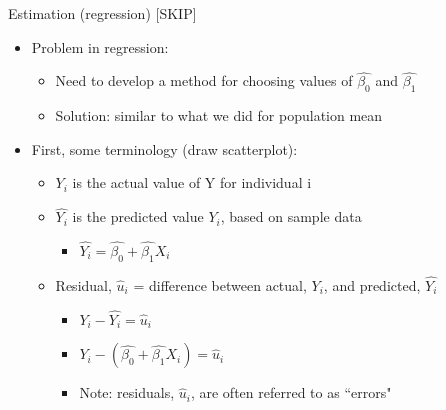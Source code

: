 \begin{frame}[shrink=10]{Estimation (regression) [SKIP]}
	\begin{itemize}
	\item Problem in regression:
		\begin{itemize}
		\item Need to develop a method for choosing values of $\hat{\beta_{0}}$ and $\hat{\beta_{1}}$ 
		\item Solution: similar to what we did for population mean 
		\end{itemize}
	\vspace{5mm}	
	\item First, some terminology (draw scatterplot):
		\begin{itemize}
		\vspace{2mm}	
		\item $Y_{i}$ is the actual value of Y for individual i 
		\vspace{2mm}	
		\item $\hat{Y_{i}}$ is the predicted value $Y_{i}$, based on sample data
			\begin{itemize}
			\item $\hat{Y_{i}} = \hat{\beta_{0}} + \hat{\beta_{1}}X_{i}$
			\end{itemize}
		\vspace{2mm}	
		\item Residual, $\hat u_{i}$ = difference between actual, $Y_{i}$, and predicted, $\hat{Y_{i}}$
			\begin{itemize}
			\item $Y_{i} - \hat{Y_{i}} = \hat u_{i}$
			\item $Y_{i} - (\hat{\beta_{0}} + \hat{\beta_{1}}X_{i}) = \hat u_{i}$
			\item Note: residuals, $\hat u_{i}$, are often referred to as ``errors"
			\end{itemize}
		\end{itemize}		
	\end{itemize}
\end{frame}


